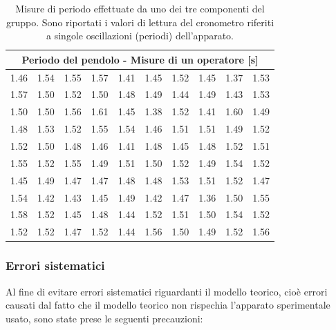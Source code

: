 \begin{table}
	\centering
	\begin{tabular} {c c c c c | c c c c c}
		\toprule
		\multicolumn{10}{c}{Periodo del pendolo - Misure di un operatore [s]} \\
		\midrule
		1.46 & 1.54 & 1.55 & 1.57 & 1.41 & 1.45 & 1.52 & 1.45 & 1.37 & 1.53 \\
		1.57 & 1.50 & 1.52 & 1.50 & 1.48 & 1.49 & 1.44 & 1.49 & 1.43 & 1.53 \\
		1.50 & 1.50 & 1.56 & 1.61 & 1.45 & 1.38 & 1.52 & 1.41 & 1.60 & 1.49 \\
		1.48 & 1.53 & 1.52 & 1.55 & 1.54 & 1.46 & 1.51 & 1.51 & 1.49 & 1.52 \\
		1.52 & 1.50 & 1.48 & 1.46 & 1.41 & 1.48 & 1.45 & 1.48 & 1.52 & 1.51 \\
		\midrule
		1.55 & 1.52 & 1.55 & 1.49 & 1.51 & 1.50 & 1.52 & 1.49 & 1.54 & 1.52 \\
		1.45 & 1.49 & 1.47 & 1.47 & 1.48 & 1.48 & 1.53 & 1.51 & 1.52 & 1.47 \\
		1.54 & 1.42 & 1.43 & 1.45 & 1.49 & 1.42 & 1.47 & 1.36 & 1.50 & 1.55 \\
		1.58 & 1.52 & 1.45 & 1.48 & 1.44 & 1.52 & 1.51 & 1.50 & 1.54 & 1.52 \\
		1.52 & 1.52 & 1.47 & 1.52 & 1.44 & 1.56 & 1.50 & 1.49 & 1.52 & 1.56 \\
	\bottomrule
	\end{tabular}
	\caption{Misure di periodo effettuate da uno dei tre componenti del gruppo.
        Sono riportati i valori di lettura del cronometro riferiti a singole oscillazioni
        (periodi) dell'apparato.}
    \label{tab:pendolo100}
\end{table}

\subsubsection{Errori sistematici}

Al fine di evitare errori sistematici riguardanti il modello teorico,
cioè errori causati dal fatto che il modello teorico non rispechia l'apparato
sperimentale usato, sono state prese le seguenti precauzioni:


